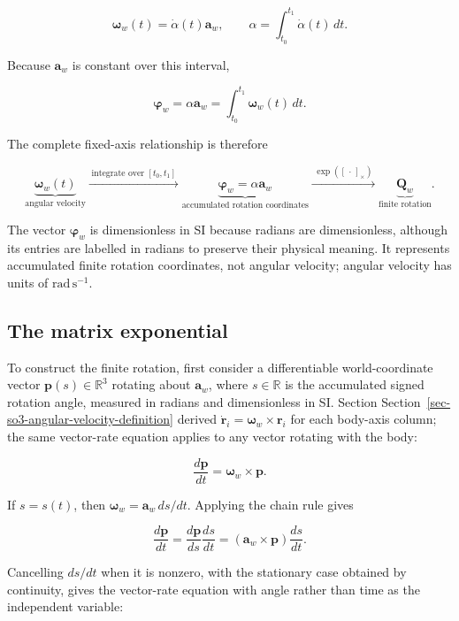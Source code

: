 \documentclass[
  australian,
  12pt,
  letterpaper,
  DIV=11,
  numbers=noendperiod,
  twoside]{scrreprt}
\begin{document}
\[
\boxed{
\boldsymbol\omega_w(t)
=
\dot\alpha(t)\mathbf a_w
},
\qquad
\alpha
=
\int_{t_0}^{t_1}\dot\alpha(t)\,dt.
\]

Because \(\mathbf a_w\) is constant over this interval,

\[
\boxed{
\boldsymbol\varphi_w
=
\alpha\mathbf a_w
=
\int_{t_0}^{t_1}\boldsymbol\omega_w(t)\,dt
}.
\]

The complete fixed-axis relationship is therefore

\[
\underbrace{
\boldsymbol\omega_w(t)
}_{\text{angular velocity}}
\xrightarrow{\;\text{integrate over }[t_0,t_1]\;}
\underbrace{
\boldsymbol\varphi_w=\alpha\mathbf a_w
}_{\text{accumulated rotation coordinates}}
\xrightarrow{\;\exp([\,\cdot\,]_\times)\;}
\underbrace{
\mathbf Q_w
}_{\text{finite rotation}}.
\]

The vector \(\boldsymbol\varphi_w\) is dimensionless in SI because
radians are dimensionless, although its entries are labelled in radians
to preserve their physical meaning. It represents accumulated finite
rotation coordinates, not angular velocity; angular velocity has units
of \(\mathrm{rad\,s^{-1}}\).

\subsection{The matrix exponential}\label{the-matrix-exponential}

To construct the finite rotation, first consider a differentiable
world-coordinate vector \(\mathbf p(s)\in\mathbb R^3\) rotating about
\(\mathbf a_w\), where \(s\in\mathbb R\) is the accumulated signed
rotation angle, measured in radians and dimensionless in SI. Section
Section~\ref{sec-so3-angular-velocity-definition} derived
\(\dot{\mathbf r}_i=\boldsymbol\omega_w\times\mathbf r_i\) for each
body-axis column; the same vector-rate equation applies to any vector
rotating with the body:

\[
\frac{d\mathbf p}{dt}
=
\boldsymbol\omega_w\times\mathbf p.
\]

If \(s=s(t)\), then \(\boldsymbol\omega_w=\mathbf a_w\,ds/dt\). Applying
the chain rule gives

\[
\frac{d\mathbf p}{dt}
=
\frac{d\mathbf p}{ds}\frac{ds}{dt}
=
\left(
\mathbf a_w\times\mathbf p
\right)
\frac{ds}{dt}.
\]

Cancelling \(ds/dt\) when it is nonzero, with the stationary case
obtained by continuity, gives the vector-rate equation with angle rather
than time as the independent variable:
\end{document}
